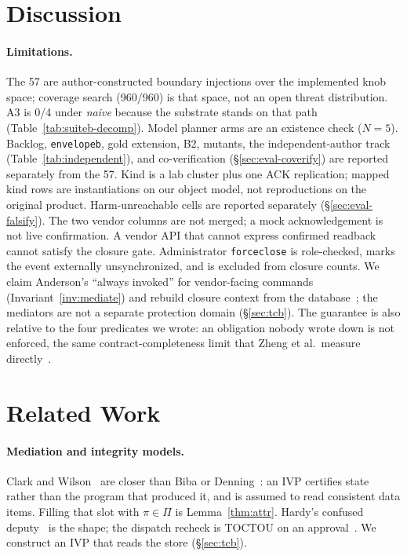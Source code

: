 \documentclass[acmsmall,manuscript,review,anonymous]{acmart}
\renewcommand{\_}{\discretionary{\textunderscore}{}{\textunderscore}}
\begin{document}
\section{Discussion}
\label{sec:disc}

\paragraph{Limitations.}
The 57 are author-constructed boundary injections over the implemented
knob space; coverage search (960/960) is that space, not an open threat
distribution. {A3} is 0/4 under \emph{naive} because the substrate stands
on that path (Table~\ref{tab:suiteb-decomp}). Model planner arms are an
existence check ($N{=}5$). Backlog, \texttt{envelope\_b}, gold extension,
B2, mutants, the independent-author track
(Table~\ref{tab:independent}), and co-verification
(\S\ref{sec:eval-coverify}) are reported separately from the 57.
Kind is a lab cluster plus one {ACK} replication; mapped kind rows are
instantiations on our object model, not reproductions on the original
product. Harm-unreachable cells are reported separately
(\S\ref{sec:eval-falsify}). The two vendor columns are not
merged; a mock acknowledgement is not live confirmation. A vendor
{API} that cannot express confirmed readback cannot satisfy the closure
gate. Administrator \texttt{force\_close} is role-checked, marks the
event externally unsynchronized, and is excluded from closure counts.
We claim Anderson's ``always invoked'' for vendor-facing commands
(Invariant~\ref{inv:mediate}) and rebuild closure context from the
database~\cite{saltzer1984endtoend}; the mediators are not a separate
protection domain (\S\ref{sec:tcb}). The guarantee is also relative to the
four predicates we wrote: an obligation nobody wrote down is not enforced,
the same contract-completeness limit that Zheng et al.\ measure
directly~\cite{zheng2026stale}.

\section{Related Work}
\label{sec:rw}

\paragraph{Mediation and integrity models.}
Clark and Wilson~\cite{clark1987comparison} are closer than Biba or
Denning~\cite{biba1977integrity,denning1976lattice}: an {IVP} certifies
state rather than the program that produced it, and is assumed to read
consistent data items. Filling that slot with $\pi\in\Pi$ is
Lemma~\ref{thm:attr}. Hardy's confused deputy~\cite{hardy1988confused}
is the shape; the dispatch recheck is TOCTOU on an
approval~\cite{bishop1996tocttou}. We construct an {IVP} that reads the
store (\S\ref{sec:tcb}).
\end{document}
